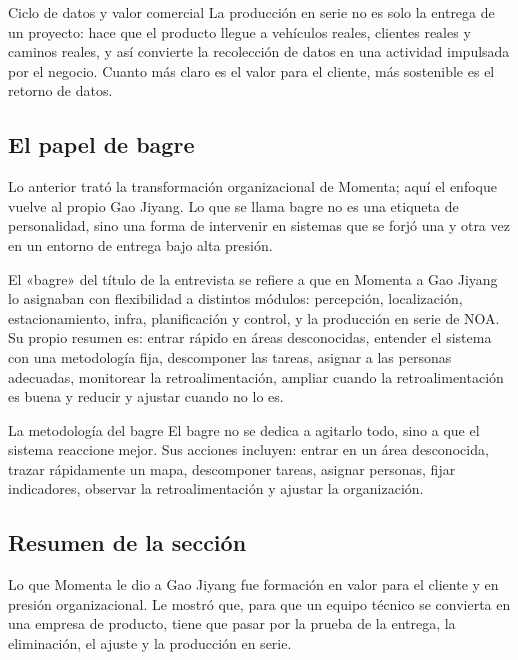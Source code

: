 \begin{importantbox}{Ciclo de datos y valor comercial}
La producción en serie no es solo la entrega de un proyecto: hace que el producto llegue a vehículos reales, clientes reales y caminos reales, y así convierte la recolección de datos en una actividad impulsada por el negocio. Cuanto más claro es el valor para el cliente, más sostenible es el retorno de datos.
\end{importantbox}

\subsection{El papel de bagre}

Lo anterior trató la transformación organizacional de Momenta; aquí el enfoque vuelve al propio Gao Jiyang. Lo que se llama bagre no es una etiqueta de personalidad, sino una forma de intervenir en sistemas que se forjó una y otra vez en un entorno de entrega bajo alta presión.

El «bagre» del título de la entrevista se refiere a que en Momenta a Gao Jiyang lo asignaban con flexibilidad a distintos módulos: percepción, localización, estacionamiento, infra, planificación y control, y la producción en serie de NOA. Su propio resumen es: entrar rápido en áreas desconocidas, entender el sistema con una metodología fija, descomponer las tareas, asignar a las personas adecuadas, monitorear la retroalimentación, ampliar cuando la retroalimentación es buena y reducir y ajustar cuando no lo es.

\begin{knowledgebox}{La metodología del bagre}
El bagre no se dedica a agitarlo todo, sino a que el sistema reaccione mejor. Sus acciones incluyen: entrar en un área desconocida, trazar rápidamente un mapa, descomponer tareas, asignar personas, fijar indicadores, observar la retroalimentación y ajustar la organización.
\end{knowledgebox}

\subsection{Resumen de la sección}

Lo que Momenta le dio a Gao Jiyang fue formación en valor para el cliente y en presión organizacional. Le mostró que, para que un equipo técnico se convierta en una empresa de producto, tiene que pasar por la prueba de la entrega, la eliminación, el ajuste y la producción en serie.
